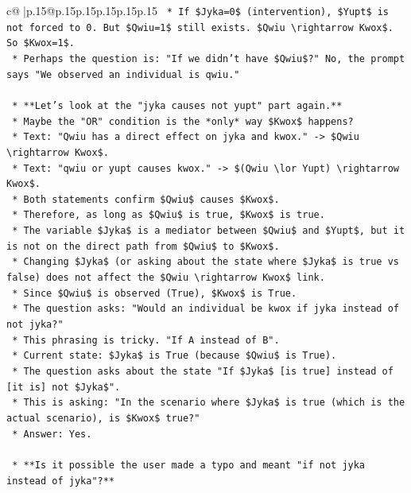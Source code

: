 \documentclass{article}
\begin{document}
{\begin{supertabular}{c@{$\;$}|p{.15\linewidth}@{}p{.15\linewidth}p{.15\linewidth}p{.15\linewidth}p{.15\linewidth}p{.15\linewidth}}
{{{\texttt{            *   If \$Jyka=0\$ (intervention), \$Yupt\$ is not forced to 0. But \$Qwiu=1\$ still exists. \$Qwiu \textbackslash{}rightarrow Kwox\$. So \$Kwox=1\$.} \\
\texttt{        *   Perhaps the question is: "If we didn't have \$Qwiu\$?" No, the prompt says "We observed an individual is qwiu."} \\
\\ 
\texttt{    *   **Let's look at the "jyka causes not yupt" part again.**} \\
\texttt{        *   Maybe the "OR" condition is the *only* way \$Kwox\$ happens?} \\
\texttt{        *   Text: "Qwiu has a direct effect on jyka and kwox." {-}> \$Qwiu \textbackslash{}rightarrow Kwox\$.} \\
\texttt{        *   Text: "qwiu or yupt causes kwox." {-}> \$(Qwiu \textbackslash{}lor Yupt) \textbackslash{}rightarrow Kwox\$.} \\
\texttt{        *   Both statements confirm \$Qwiu\$ causes \$Kwox\$.} \\
\texttt{        *   Therefore, as long as \$Qwiu\$ is true, \$Kwox\$ is true.} \\
\texttt{        *   The variable \$Jyka\$ is a mediator between \$Qwiu\$ and \$Yupt\$, but it is not on the direct path from \$Qwiu\$ to \$Kwox\$.} \\
\texttt{        *   Changing \$Jyka\$ (or asking about the state where \$Jyka\$ is true vs false) does not affect the \$Qwiu \textbackslash{}rightarrow Kwox\$ link.} \\
\texttt{        *   Since \$Qwiu\$ is observed (True), \$Kwox\$ is True.} \\
\texttt{        *   The question asks: "Would an individual be kwox if jyka instead of not jyka?"} \\
\texttt{        *   This phrasing is tricky. "If A instead of B".} \\
\texttt{        *   Current state: \$Jyka\$ is True (because \$Qwiu\$ is True).} \\
\texttt{        *   The question asks about the state "If \$Jyka\$ {[}is true{]} instead of {[}it is{]} not \$Jyka\$".} \\
\texttt{        *   This is asking: "In the scenario where \$Jyka\$ is true (which is the actual scenario), is \$Kwox\$ true?"} \\
\texttt{        *   Answer: Yes.} \\
\\ 
\texttt{    *   **Is it possible the user made a typo and meant "if not jyka instead of jyka"?**} \\
}}}
\end{supertabular}}
\end{document}
